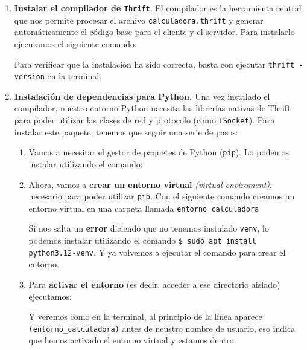 \documentclass[a4paper,12pt]{article}
\begin{document}
			\begin{enumerate}
				\item \textbf{Instalar el compilador de \texttt{Thrift}}. El compilador es la herramienta central que nos permite procesar el archivo \texttt{calculadora.thrift} y generar automáticamente el código base para el cliente y el servidor. Para instalarlo ejecutamos el siguiente comando:
				
					\begin{center}
					\end{center}
				
				Para verificar que la instalación ha sido correcta, basta con ejecutar \texttt{thrift -version} en la terminal.
				
				\item \textbf{Instalación de dependencias para Python.} 	Una vez instalado el compilador, nuestro entorno Python necesita las librerías nativas de Thrift para poder utilizar las clases de red y protocolo (como \texttt{TSocket}). Para instalar este paquete, tenemos que seguir una serie de pasos:
				
					\begin{enumerate}
						\item Vamos a necesitar el gestor de paquetes de Python (\texttt{pip}). Lo podemos instalar utilizando el comando:
							\begin{center}
							\end{center}
						
						\item Ahora, vamos a \textbf{crear un entorno virtual} \textit{(virtual enviroment)}, necesario para poder utilizar \texttt{pip}. Con el siguiente comando creamos un entorno virtual en una carpeta llamada \texttt{entorno\_calculadora }
							\begin{center}
							\end{center}
							Si nos salta un \textbf{error} diciendo que no tenemos instalado \texttt{venv}, lo podemos instalar utilizando el comando \texttt{\$ sudo apt install python3.12-venv}. Y ya volvemos  a ejecutar el comando para crear el entorno.
						
						\item  Para \textbf{activar el entorno} (es decir, acceder a ese directorio aislado) ejecutamos:
							\begin{center}
							\end{center}
							Y veremos como en la terminal, al principio de la línea aparece \texttt{(entorno\_calculadora)} antes de neustro nombre de usuario, eso indica que hemos activado el entorno virtual y estamos dentro.
						

\end{enumerate}
\end{enumerate}
\end{document}
